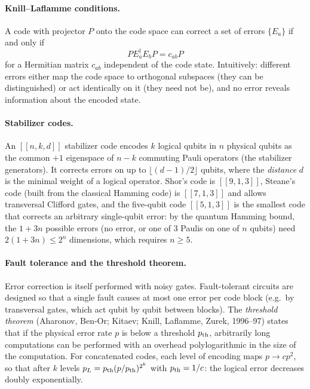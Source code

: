 \paragraph{Knill--Laflamme conditions.} A code with projector $P$ onto the code space can correct a set of errors $\{E_a\}$ if and only if
\begin{equation}
  PE_a^\dagger E_bP=c_{ab}P
\end{equation}
for a Hermitian matrix $c_{ab}$ independent of the code state. Intuitively: different errors either map the code space to orthogonal subspaces (they can be distinguished) or act identically on it (they need not be),
and no error reveals information about the encoded state.

\paragraph{Stabilizer codes.} An $[[n,k,d]]$ stabilizer code encodes $k$ logical qubits in $n$ physical qubits as the common $+1$ eigenspace of $n-k$ commuting Pauli operators (the stabilizer generators). It
corrects errors on up to $\lfloor(d-1)/2\rfloor$ qubits, where the \emph{distance} $d$ is the minimal weight of a logical operator. Shor's code is $[[9,1,3]]$, Steane's code (built from the classical Hamming code)
is $[[7,1,3]]$ and allows transversal Clifford gates, and the five-qubit code $[[5,1,3]]$ is the smallest code that corrects an arbitrary single-qubit error: by the quantum Hamming bound, the $1+3n$ possible errors (no error,
or one of 3 Paulis on one of $n$ qubits) need $2(1+3n)\le2^n$ dimensions, which requires $n\ge5$.

\paragraph{Fault tolerance and the threshold theorem.} Error correction is itself performed with noisy gates. Fault-tolerant circuits are designed so that a single fault causes at most one error per code block
(e.g.\ by transversal gates, which act qubit by qubit between blocks). The \emph{threshold theorem} (Aharonov, Ben-Or; Kitaev; Knill, Laflamme, Zurek, 1996--97) states that if the physical error rate $p$ is below a
threshold $p_{\rm th}$, arbitrarily long computations can be performed with an overhead polylogarithmic in the size of the computation. For concatenated codes, each level of encoding maps $p\to cp^2$, so that after $k$ levels
$p_L=p_{\rm th}(p/p_{\rm th})^{2^k}$ with $p_{\rm th}=1/c$: the logical error decreases doubly exponentially.

